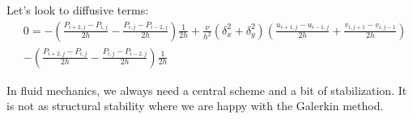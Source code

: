 Let's look to diffusive terms: 
\begin{equation}
\begin{aligned}
&0 = -\left( \frac{P_{i+2,j} - P_{i,j}}{2h} - \frac{P_{i,j} - P_{i-2,j}}{2h} \right) \frac{1}{2h} + \frac{\nu}{h^2}(\delta _x^2+ \delta _y^2)\left( \frac{u_{i+1,j}- u_{i-1,j}}{2h} + \frac{v_{i,j+1}- v_{i,j-1}}{2h} \right) \\
&-\left( \frac{P_{i+2,j} - P_{i,j}}{2h}- \frac{P_{i,j} - P_{i-2,j}}{2h} \right) \frac{1}{2h} 
\end{aligned}
\end{equation}

In fluid mechanics, we always need a central scheme and a bit of stabilization. It is not as structural stability where we are happy with the Galerkin method. 